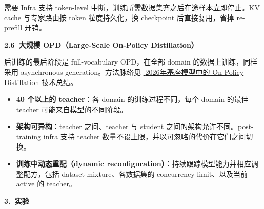 \documentclass[zihao=false,fontset=windows]{ctexart}
\newcommand{\feiEmoji}[1]{{\emojifont #1}}
\begin{document}
需要 Infra 支持 token-level 中断，训练所需数据集齐之后在途样本立即停止。KV cache 与专家路由按 token 粒度持久化，换 checkpoint 后直接复用，省掉 re-prefill 开销。\par

\par{}\vspace{0.8em}\noindent \begin{tcolorbox}[boxrule=0pt,arc=3pt,colback=callOrange,left=3pt,right=3pt,top=2pt,bottom=2pt,before skip=0pt,after skip=0pt]{\bfseries \textcolor{feishuBlue}{2.6}\ 大规模 OPD（Large-Scale On-Policy Distillation）}\end{tcolorbox}\par\vspace{0.28em}

后训练的最后阶段是 full-vocabulary OPD，在全部 domain 的数据上训练，同样采用 asynchronous generation。方法脉络见 \href{https://my.feishu.cn/wiki/TaPYw0sGViHBFNkXdFIceLTWnEg}{\feiEmoji{📗}2026年基座模型中的 On-Policy Distillation 技术总结}。\par
\begin{itemize}
\item 
\textbf{40 个以上的 teacher}：各 domain 的训练过程不同，每个 domain 的最佳 teacher 可能来自模型的不同阶段。\par
\item 
\textbf{架构可异构}：teacher 之间、teacher 与 student 之间的架构允许不同。post-training infra 支持 teacher 数量不设上限，并以可忽略的代价在它们之间切换。\par
\item 
\textbf{训练中动态重配（dynamic reconfiguration）}：持续跟踪模型能力并相应调整配方，包括 dataset mixture、各数据集的 concurrency limit、以及当前 active 的 teacher。\par
\end{itemize}


\par{}\vspace{0.8em}\noindent \begin{tcolorbox}[boxrule=0pt,arc=3pt,colback=callRed,left=3pt,right=3pt,top=2pt,bottom=2pt,before skip=0pt,after skip=0pt]{\bfseries \textcolor{feishuBlue}{3.}\ 实验}\end{tcolorbox}\par\vspace{0.28em}
\end{document}
